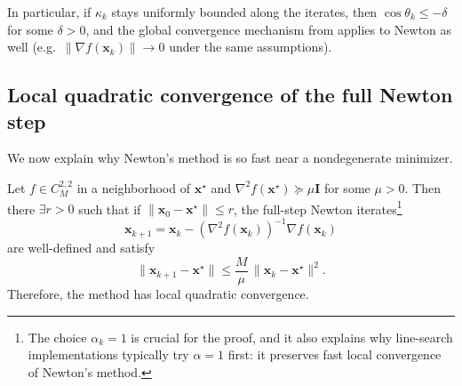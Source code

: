 \noindent In particular, if $\kappa_k$ stays uniformly bounded along the
iterates, then $\cos\theta_k\le -\delta$ for some $\delta>0$, and the global
convergence mechanism from  applies to Newton as well
(e.g.\ $\|\nabla f(\mathbf{x}_k)\|\to 0$ under the same assumptions).

\subsection{Local quadratic convergence of the full Newton step}
\label{sec:ch3-local-conv}
We now explain why Newton's method is so fast near a nondegenerate minimizer.

\begin{theorem}
\label{thm:ch3-local-quadratic}
Let $f\in C^{2,2}_M$ in a neighborhood of $\mathbf{x}^{\star}$ and
$\nabla^2 f(\mathbf{x}^\star)\succeq \mu \mathbf{I}$
for some $\mu>0$.
Then there $\exists r>0$ such that if $\|\mathbf{x}_0-\mathbf{x}^\star\|\le r$,
the full-step Newton iterates\footnote{The choice $\alpha_k=1$ is crucial for
the proof, and it also explains why line-search implementations typically try
$\alpha=1$ first: it preserves fast local convergence of Newton's method.}
\[
  \mathbf{x}_{k+1}=\mathbf{x}_k-(\nabla^2 f(\mathbf{x}_k))^{-1}\nabla f(\mathbf{x}_k)
\]
are well-defined and satisfy
\[
  \|\mathbf{x}_{k+1}-\mathbf{x}^\star\|
  \le \frac{M}{\mu}\,\|\mathbf{x}_k-\mathbf{x}^\star\|^2.
\]
Therefore, the method has local quadratic convergence.
\end{theorem}

